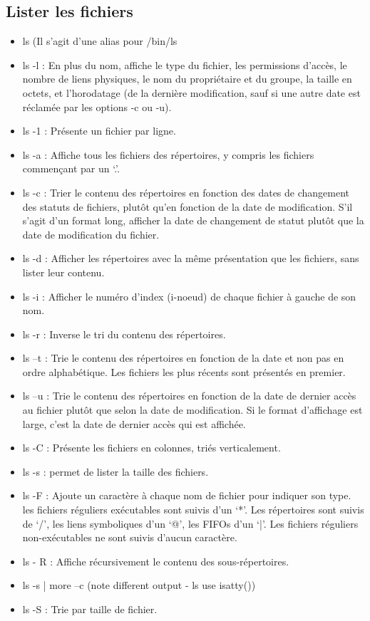 \documentclass{article}[12pt]
\begin{document}
\subsection{Lister les fichiers}
\begin{itemize}
	\item ls (Il s'agit d'une alias pour /bin/ls
    \item ls -l : En  plus  du  nom, affiche le type du fichier, les permissions d'accès, le nombre de liens  physiques, le  nom  du propriétaire et du groupe, la taille en octets, et l'horodatage (de la  dernière  modification,  sauf  si une autre date est réclamée par les options -c ou -u).
    \item ls -1 : Présente un fichier par ligne.
    \item ls -a : Affiche tous les fichiers des répertoires, y  compris les fichiers commençant par un `.'.
    \item ls -c : Trier  le  contenu  des répertoires en fonction des dates de changement des statuts de fichiers, plutôt qu'en  fonction  de  la date de modification.  S'il
s'agit  d'un  format  long,  afficher  la  date  de changement  de statut plutôt que la date de modification du fichier.
	\item ls -d :  Afficher les répertoires avec la même  présentation que  les  fichiers,  sans  lister leur contenu.  
    \item ls -i : Afficher le  numéro  d'index  (i-noeud)  de  chaque fichier à gauche de son nom.
    \item ls -r :  Inverse le tri du contenu des répertoires.
    \item ls –t : Trie le contenu des répertoires en fonction de la date et non pas en ordre alphabétique. Les fichiers les plus récents sont présentés en premier.
    \item ls –u : Trie  le contenu des répertoires en fonction de la date de dernier accès au fichier plutôt  que  selon la  date  de modification. Si le format d'affichage est large, c'est la date de dernier accès  qui  est affichée.
    \item ls -C : Présente  les  fichiers  en colonnes, triés verticalement.
    \item ls -s : permet de lister la taille des fichiers. 
    \item ls -F : Ajoute un caractère à chaque nom de  fichier  pour indiquer son type.  les fichiers réguliers exécutables sont suivis d'un  `*'.  Les  répertoires  sont suivis  de `/', les liens symboliques d'un `@', les FIFOs  d'un  `|'.   Les  fichiers  réguliers   non-exécutables ne sont suivis d'aucun caractère.
    \item ls - R : Affiche  récursivement  le contenu des sous-répertoires.
	\item ls -s | more –c (note different output - ls use isatty())
	\item ls -S : Trie par taille de fichier.
\end{itemize}
\end{document}
